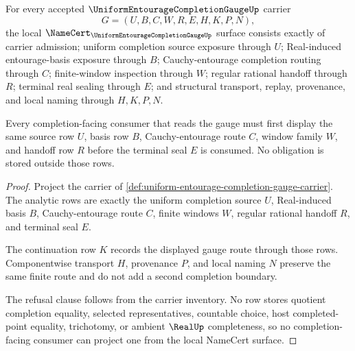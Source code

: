 \begin{theorem}
\label{thm:uniform-entourage-completion-gauge-namecert-obligations}
For every accepted $\UniformEntourageCompletionGaugeUp$ carrier
$$
G=(U,B,C,W,R,E,H,K,P,N),
$$
the local $\NameCert_{\UniformEntourageCompletionGaugeUp}$ surface consists exactly of carrier admission; uniform completion source exposure through $U$; Real-induced entourage-basis exposure through $B$; Cauchy-entourage completion routing through $C$; finite-window inspection through $W$; regular rational handoff through $R$; terminal real sealing through $E$; and structural transport, replay, provenance, and local naming through $H,K,P,N$.

Every completion-facing consumer that reads the gauge must first display the same source row $U$, basis row $B$, Cauchy-entourage route $C$, window family $W$, and handoff row $R$ before the terminal seal $E$ is consumed. No obligation is stored outside those rows.
\end{theorem}
\begin{proof}
Project the carrier of \autoref{def:uniform-entourage-completion-gauge-carrier}. The analytic rows are exactly the uniform completion source $U$, Real-induced basis $B$, Cauchy-entourage route $C$, finite windows $W$, regular rational handoff $R$, and terminal seal $E$.

The continuation row $K$ records the displayed gauge route through those rows. Componentwise transport $H$, provenance $P$, and local naming $N$ preserve the same finite route and do not add a second completion boundary.

The refusal clause follows from the carrier inventory. No row stores quotient completion equality, selected representatives, countable choice, host completed-point equality, trichotomy, or ambient $\RealUp$ completeness, so no completion-facing consumer can project one from the local NameCert surface.
\end{proof}




